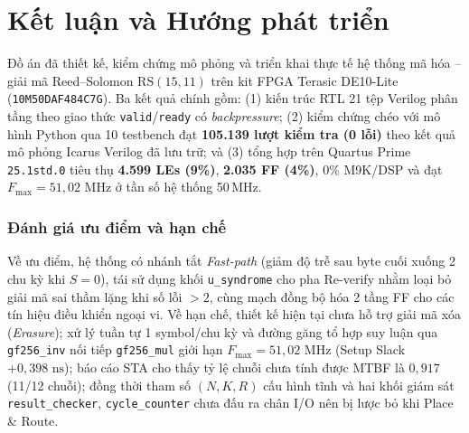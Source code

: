 \documentclass[11pt,a4paper]{report}
\begin{document}
\chapter*{Kết luận và Hướng phát triển}
{}
\label{ch:conclusion}

Đồ án đã thiết kế, kiểm chứng mô phỏng và triển khai thực tế hệ thống mã hóa -- giải mã Reed--Solomon $\text{RS}(15,11)$ trên kit FPGA Terasic DE10-Lite (\texttt{10M50DAF484C7G}). Ba kết quả chính gồm: (1) kiến trúc RTL 21 tệp Verilog phân tầng theo giao thức \texttt{valid}/\texttt{ready} có \textit{backpressure}; (2) kiểm chứng chéo với mô hình Python qua 10 testbench đạt \textbf{105.139 lượt kiểm tra (0 lỗi)} theo kết quả mô phỏng Icarus Verilog đã lưu trữ; và (3) tổng hợp trên Quartus Prime \texttt{25.1std.0} tiêu thụ \textbf{4.599 LEs (9\%)}, \textbf{2.035 FF (4\%)}, $0\%$ M9K/DSP và đạt $F_{\max} = 51{,}02\text{ MHz}$ ở tần số hệ thống 50\,MHz.

\subsection*{Đánh giá ưu điểm và hạn chế}
Về ưu điểm, hệ thống có nhánh tắt \textit{Fast-path} (giảm độ trễ sau byte cuối xuống 2 chu kỳ khi $S=0$), tái sử dụng khối \texttt{u\_syndrome} cho pha Re-verify nhằm loại bỏ giải mã sai thầm lặng khi số lỗi $>2$, cùng mạch đồng bộ hóa 2 tầng FF cho các tín hiệu điều khiển ngoại vi. Về hạn chế, thiết kế hiện tại chưa hỗ trợ giải mã xóa (\textit{Erasure}); xử lý tuần tự 1 symbol/chu kỳ và đường găng tổ hợp suy luận qua \texttt{gf256\_inv} nối tiếp \texttt{gf256\_mul} giới hạn $F_{\max} = 51{,}02\text{ MHz}$ (Setup Slack $+0{,}398\text{ ns}$); báo cáo STA cho thấy tỷ lệ chuỗi chưa tính được MTBF là $0{,}917$ (11/12 chuỗi); đồng thời tham số $(N,K,R)$ cấu hình tĩnh và hai khối giám sát \texttt{result\_checker}, \texttt{cycle\_counter} chưa đấu ra chân I/O nên bị lược bỏ khi Place \& Route.
\end{document}
